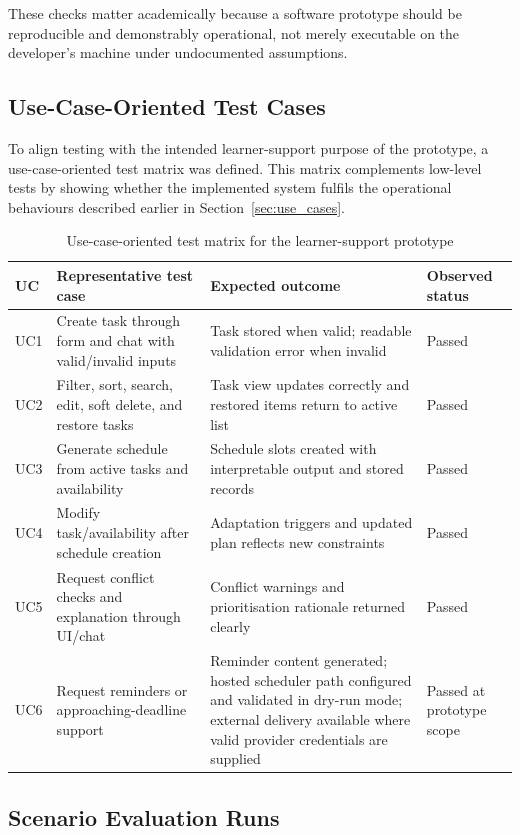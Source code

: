 \documentclass[12pt]{article}
\begin{document}
These checks matter academically because a software prototype should be reproducible and demonstrably operational, not merely executable on the developer's machine under undocumented assumptions.

\subsection{Use-Case-Oriented Test Cases}
To align testing with the intended learner-support purpose of the prototype, a use-case-oriented test matrix was defined. This matrix complements low-level tests by showing whether the implemented system fulfils the operational behaviours described earlier in Section~\ref{sec:use_cases}.

\begin{table}[h!]
\centering
\scriptsize
\begin{tabular}{|p{1.2cm}|p{3.5cm}|p{4.3cm}|p{2.7cm}|}
\hline
\textbf{UC} & \textbf{Representative test case} & \textbf{Expected outcome} & \textbf{Observed status} \\
\hline
UC1 & Create task through form and chat with valid/invalid inputs & Task stored when valid; readable validation error when invalid & Passed \\
\hline
UC2 & Filter, sort, search, edit, soft delete, and restore tasks & Task view updates correctly and restored items return to active list & Passed \\
\hline
UC3 & Generate schedule from active tasks and availability & Schedule slots created with interpretable output and stored records & Passed \\
\hline
UC4 & Modify task/availability after schedule creation & Adaptation triggers and updated plan reflects new constraints & Passed \\
\hline
UC5 & Request conflict checks and explanation through UI/chat & Conflict warnings and prioritisation rationale returned clearly & Passed \\
\hline
UC6 & Request reminders or approaching-deadline support & Reminder content generated; hosted scheduler path configured and validated in dry-run mode; external delivery available where valid provider credentials are supplied & Passed at prototype scope \\
\hline
\end{tabular}
\caption{Use-case-oriented test matrix for the learner-support prototype}
\label{tab:use_case_test_matrix}
\end{table}

\subsection{Scenario Evaluation Runs}
\end{document}
